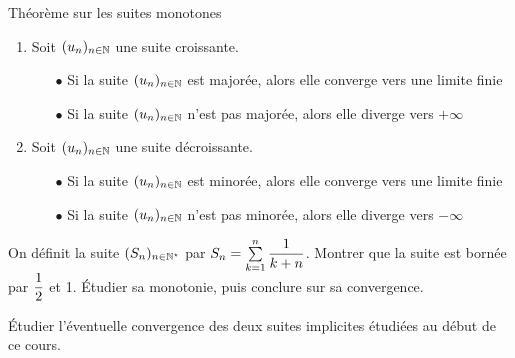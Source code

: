 \documentclass[a4paper, 11pt]{article}
\begin{document}
\begin{theorem} Th\'eor\`{e}me sur les suites monotones
\begin{enumerate}
 \item Soit $(u_n)_{n\in \mathbb{N}}$ une suite croissante.
 \begin{itemize}
\item[$\bullet$] Si la suite $(u_n)_{n\in \mathbb{N}}$ est major\'ee, alors elle converge vers une limite finie

\item[$\bullet$] Si la suite $(u_n)_{n\in \mathbb{N}}$ n'est pas major\'ee, alors elle diverge vers $+\infty$
\end{itemize}
\item Soit $(u_n)_{n\in \mathbb{N}}$ une suite d\'ecroissante.
 \begin{itemize}
\item[$\bullet$] Si la suite $(u_n)_{n\in \mathbb{N}}$ est minor\'ee, alors elle converge vers une limite finie
\item[$\bullet$] Si la suite $(u_n)_{n\in \mathbb{N}}$ n'est pas minor\'ee, alors elle diverge vers $-\infty$ \vspace{0.3cm}
\end{itemize}
\end{enumerate}



\end{theorem}





{\footnotesize 
\begin{exercice} On d\'efinit la suite $(S_n)_{n\in\mathbb{N}^{\star}}$ par $S_n=\sum\limits_{k=1}^n \displaystyle\frac{1}{k+n}$. Montrer que la suite est born\'ee par $\displaystyle\frac{1}{2}$ et 1. \'Etudier sa monotonie, puis conclure sur sa convergence.
\end{exercice}}
{\footnotesize 
\begin{exercice}
\'Etudier l'\'eventuelle convergence des deux suites implicites \'etudi\'ees au d\'ebut de ce cours. 
\end{exercice}}



\end{document}
